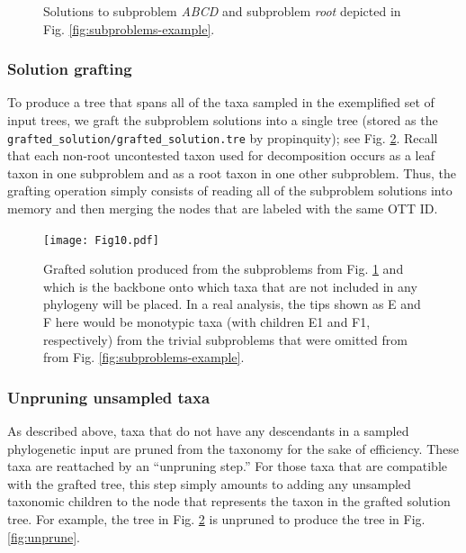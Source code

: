 \documentclass[fleqn,12pt,lineno,english]{wlpeerj}
\begin{document}
\begin{figure}
\hfill{}\hfill{}\hfill{}

\caption{Solutions to subproblem \emph{ABCD} and subproblem \emph{root} depicted in Fig. \ref{fig:subproblems-example}.}
\label{fig:subproblem-solutions.}
\end{figure}


\subsubsection{Solution grafting}

To produce a tree that spans all of the taxa sampled in the exemplified
set of input trees, we graft the subproblem solutions into a single
tree (stored as the \texttt{grafted\_solution/grafted\_solution.tre}
by propinquity); see Fig. \ref{fig:grafted-solution}. Recall that each non-root uncontested taxon used
for decomposition occurs as a leaf taxon in one subproblem and as
a root taxon in one other subproblem. Thus, the grafting operation
simply consists of reading all of the subproblem solutions into memory
and then merging the nodes that are labeled with the same OTT ID.

\begin{figure}
\begin{centering}
\texttt{[image: Fig10.pdf]}
\par\end{centering}
\caption{Grafted solution produced from the subproblems from
Fig. \ref{fig:subproblem-solutions.} and which is the 
backbone onto which taxa that are not included in any phylogeny
will be placed.
In a real analysis, the tips shown as E and F here
would be monotypic taxa (with children E1 and F1, respectively)
from the trivial subproblems that were omitted from from Fig. \ref{fig:subproblems-example}.}
\label{fig:grafted-solution}
\end{figure}


\subsubsection{Unpruning unsampled taxa}

As described above, taxa that do not have any descendants in a sampled
phylogenetic input are pruned from the taxonomy for the sake of efficiency.
These taxa are reattached by an ``unpruning step.'' For those taxa
that are compatible with the grafted tree, this step simply amounts
to adding any unsampled taxonomic children to the node that represents
the taxon in the grafted solution tree.  For example, the tree in
Fig. \ref{fig:grafted-solution} is unpruned to produce the tree in
Fig. \ref{fig:unprune}.
\end{document}
